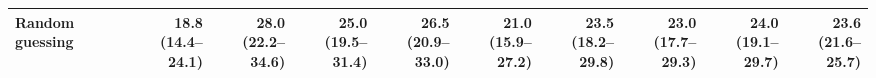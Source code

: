 \begin{tabular}{@{}lrrrrrrrrr@{}}
Random guessing & \makecell[r]{18.8 \\ \scriptsize(14.4--24.1)} & \makecell[r]{28.0 \\ \scriptsize(22.2--34.6)} & \makecell[r]{25.0 \\ \scriptsize(19.5--31.4)} & \makecell[r]{26.5 \\ \scriptsize(20.9--33.0)} & \makecell[r]{21.0 \\ \scriptsize(15.9--27.2)} & \makecell[r]{23.5 \\ \scriptsize(18.2--29.8)} & \makecell[r]{23.0 \\ \scriptsize(17.7--29.3)} & \makecell[r]{24.0 \\ \scriptsize(19.1--29.7)} & \makecell[r]{23.6 \\ \scriptsize(21.6--25.7)} \\
\bottomrule
\end{tabular}
